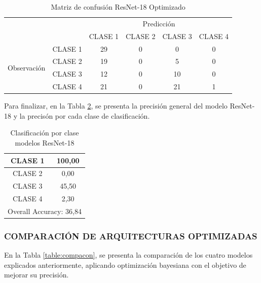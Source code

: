 \begin{table}[htbp]
	\centering
	\begin{tabular}{|c|l|c|c|c|c|}
		\hline
		\multicolumn{2}{|c|}{\multirow{2}[4]{*}{}} & \multicolumn{4}{c|}{Predicción} \bigstrut\\
		\cline{3-6}    \multicolumn{2}{|c|}{} & CLASE 1 & CLASE 2 & CLASE 3 & CLASE 4 \bigstrut\\
		\hline
		\multirow{4}[8]{*}{\begin{sideways}Observación\end{sideways}} & CLASE 1 & 29     & 0     & 0    & 0 \bigstrut\\
		\cline{2-6}          & CLASE 2 & 19     & 0     & 5    & 0 \bigstrut\\
		\cline{2-6}          & CLASE 3 & 12     & 0     & 10    & 0 \bigstrut\\
		\cline{2-6}          & CLASE 4 & 21     & 0     & 21    & 1 \bigstrut\\
		\hline
	\end{tabular}%
	\caption{Matriz de confusión ResNet-18 Optimizado }
	\label{tab:MC_resnet_OPT}%
\end{table}%
Para finalizar, en la Tabla \ref{tab:resnetoptclases}, se presenta la precisión general del modelo ResNet-18 y la precisón por cada clase de clasificación.
\begin{table}[htbp]
	\centering
	\begin{tabular}{|c|c|}
		\hline
		CLASE 1 & 100,00 \bigstrut\\
		\hline
		CLASE 2 & 0,00 \bigstrut\\
		\hline
		CLASE 3 & 45,50 \bigstrut\\
		\hline
		CLASE 4 & 2,30 \bigstrut\\
		\hline
		\multicolumn{2}{|c|}{Overall Accuracy: 36,84} \bigstrut\\
		\hline
	\end{tabular}%
	\caption{Clasificación por clase modelos ResNet-18}
	\label{tab:resnetoptclases}%
\end{table}%


\subsubsection{\MakeUppercase{Comparación de Arquitecturas Optimizadas}}

En la Tabla \ref{table:compacon}, se presenta la comparación de los cuatro modelos explicados anteriormente, aplicando optimización bayesiana con el objetivo de mejorar su precisión.

